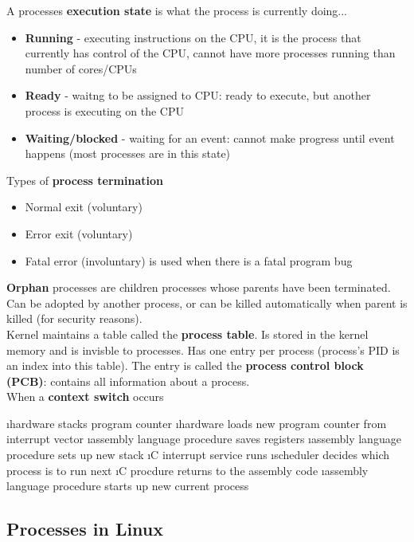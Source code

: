\documentclass{article}
\begin{document}
    \noindent A processes \textbf{execution state} is what the process is currently doing...

    \begin{itemize}
    \item \textbf{Running} - executing instructions on the CPU, it is the process that currently has control of the CPU, cannot have more processes running than number of cores/CPUs
    \item \textbf{Ready} - waitng to be assigned to CPU: ready to execute, but another process is executing on the CPU
    \item \textbf{Waiting/blocked} - waiting for an event: cannot make progress until event happens (most processes are in this state)
    \end{itemize}

    \noindent Types of \textbf{process termination}
    \begin{itemize}
    \item Normal exit (voluntary)
    \item Error exit (voluntary)
    \item Fatal error (involuntary) is used when there is a fatal program bug
    \end{itemize}

    \noindent \textbf{Orphan} processes are children processes whose parents have been terminated. Can be adopted by another process, or can be killed automatically when parent is killed (for security reasons). \\

    \noindent Kernel maintains a table called the \textbf{process table}. Is stored in the kernel memory and is invisble to processes. Has one entry per process (process's PID is an index into this table). The entry is called the \textbf{process control block (PCB)}: contains all information about a process. \\

    \noindent When a \textbf{context switch} occurs
    
    \bl
    \i hardware stacks program counter
    \i hardware loads new program counter from interrupt vector
    \i assembly language procedure saves registers 
    \i assembly language procedure sets up new stack
    \i C interrupt service runs
    \i scheduler decides which process is to run next
    \i C procdure returns to the assembly code
    \i assembly language procedure starts up new current process
    \el

\subsection{Processes in Linux}
\end{document}
